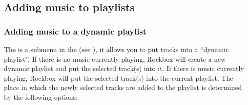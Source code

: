\subsection{Adding music to playlists}
  
\subsubsection{\label{ref:playlist_submenu}Adding music to a dynamic playlist}
The  is a submenu in the  (see
), it allows you to put tracks into a
``dynamic playlist''. If there is no music currently playing, Rockbox will
create a new dynamic playlist and put the selected track(s) into it.
If there is music currently playing, Rockbox will put the
selected track(s) into the current playlist. The place in which the newly
selected tracks are added to the playlist is determined by the following
options:

